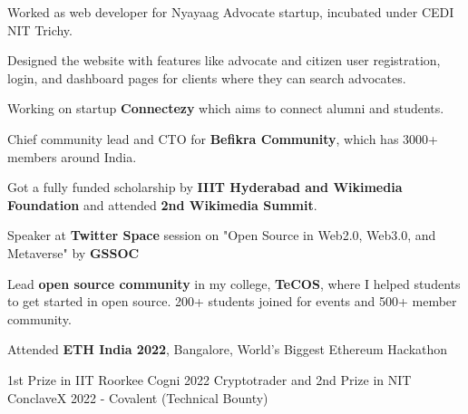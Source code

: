 \documentclass[]{deedy-resume-openfont}
\begin{document}
\begin{minipage}[t]{0.69\textwidth}
\hfill {}
\begin{tightemize}
    \item Worked as web developer for Nyayaag Advocate startup, incubated under CEDI NIT Trichy.
    \item Designed the website with features like advocate and citizen user registration, login, and dashboard pages for clients where they can search advocates.
\end{tightemize}

\sectionsep


\begin{tightemize}
    \item Working on startup \textbf{Connectezy} which aims to connect alumni and students.
\end{tightemize}

\begin{tightemize}
    \item Chief community lead and CTO for \textbf{Befikra Community}, which has 3000+ members around India.
\end{tightemize}

\begin{tightemize}
    \item Got a fully funded scholarship by \textbf{IIIT Hyderabad and Wikimedia Foundation} and attended \textbf{2nd Wikimedia Summit}.
\end{tightemize}

\begin{tightemize}
    \item Speaker at \textbf{Twitter Space} session on "Open Source in Web2.0, Web3.0, and Metaverse" by \textbf{GSSOC}
\end{tightemize}

\begin{tightemize}
    \item Lead \textbf{open source community} in my college, \textbf{TeCOS}, where I helped students to get started in open source. 200+ students joined for events and 500+ member community.
\end{tightemize}

\begin{tightemize}
    \item Attended \textbf{ETH India 2022}, Bangalore, World’s Biggest Ethereum Hackathon 
\end{tightemize}

\begin{tightemize}
    \item 1st Prize in IIT Roorkee Cogni 2022 Cryptotrader and 2nd Prize in NIT ConclaveX 2022 - Covalent (Technical Bounty)
\end{tightemize}

\sectionsep
\end{minipage} 
\end{document}
